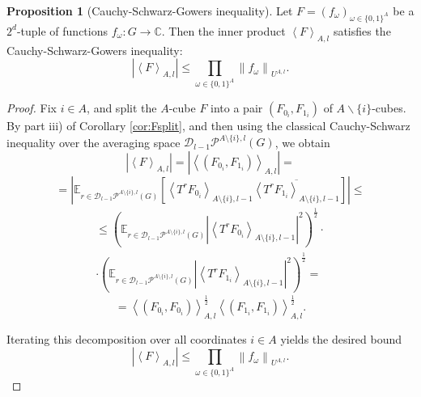 \documentclass{amsart}
\theoremstyle{definition}
\newtheorem{proposition}[theorem]{Proposition}
\theoremstyle{remark}
\numberwithin{equation}{section}
\begin{document}
\begin{proposition}[Cauchy-Schwarz-Gowers inequality]
\label{CSG}
Let $F = (f_\omega)_{\omega \in \{0,1\}^A}$ be a $2^d$-tuple of functions $f_\omega: G \to \mathbb{C}$.
Then the inner product $\left\langle F \right\rangle_{A,l}$ satisfies the Cauchy-Schwarz-Gowers inequality:
$$ \left| \left\langle F  \right\rangle_{A,l} \right| \le \prod_{\omega \in \{0,1\}^{A}}  \left\| f_\omega  \right\|_{U^{A,l}}. $$
\end{proposition} 
\begin{proof} Fix $i \in A$, and split the $A$-cube $F$ into a pair $\left(F_{0_i}, F_{1_i}\right)$ of $A \backslash \{i\}$-cubes. By part  iii) of Corollary \ref{cor:Fsplit}, and then using the classical Cauchy-Schwarz inequality over the  averaging space $ \mathcal{D}_{l-1}\mathcal{P}^{A \setminus \{i\},l}(G)$, we obtain
$$ \left| \left\langle F  \right\rangle_{A,l} \right| = \left| \left\langle \left(F_{0_i}, F_{1_i}\right)  \right\rangle_{A,l} \right| = $$
$$= \left| \mathbb{E}_{r \in \mathcal{D}_{l-1}\mathcal{P}^{A \setminus \{i\},l}(G)} \left[ \left\langle   T^{r}F_{0_i} \right\rangle_{A\setminus\{i\},l-1}  \overline{ \left\langle   T^{r}F_{1_i}  \right\rangle_{A\setminus\{i\},l-1}}\right] \right| \le
$$ 
\begin{multline*}
\le \left(\mathbb{E}_{r \in \mathcal{D}_{l-1}\mathcal{P}^{A \setminus \{i\},l}(G)} \left| \left\langle   T^{r}F_{0_i} \right\rangle_{A\setminus\{i\},l-1}\right|^2\right)^{\frac{1}{2}} \cdot \\ \cdot
\left(\mathbb{E}_{r \in \mathcal{D}_{l-1}\mathcal{P}^{A \setminus \{i\},l}(G)} \left| \left\langle   T^{r}F_{1_i} \right\rangle_{A\setminus\{i\},l-1}\right|^2\right)^{\frac{1}{2}}=
\end{multline*}
$$ = \left\langle \left(F_{0_i}, F_{0_i}\right)  \right\rangle_{A,l}^{\frac{1}{2}} \left\langle \left(F_{1_i}, F_{1_i}\right)  \right\rangle_{A,l}^{\frac{1}{2}}.$$

 Iterating this decomposition over all coordinates \(i \in A\) yields the desired bound
$$
\left| \left\langle F \right\rangle_{A,l} \right| \le \prod_{\omega \in \{0,1\}^A} \left\| f_\omega \right\|_{U^{A,l}}.
$$
\end{proof}
\end{document}
